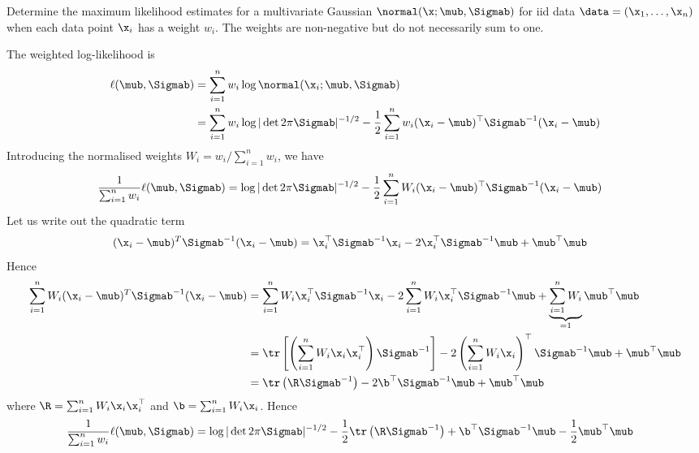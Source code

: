 \begin{exenumerate}

\item Determine the maximum likelihood estimates for a multivariate Gaussian
  $\normal(\x; \mub, \Sigmab)$ for iid data $\data = (\x_1, \ldots, \x_n)$ when
  each data point $\x_i$ has a weight $w_i$. The weights are non-negative but do
  not necessarily sum to one.

  \begin{solution}
    The weighted log-likelihood is
    \begin{align}
      \ell(\mub, \Sigmab) & = \sum_{i=1}^n w_i \log \normal(\x_i; \mub, \Sigmab)\\
                          & =  \sum_{i=1}^n w_i \log |\det 2 \pi \Sigmab|^{-1/2} - \frac{1}{2} \sum_{i=1}^n w_i (\x_i-\mub)^\top\Sigmab^{-1}(\x_i-\mub)
    \end{align}
    Introducing the normalised weights $W_i = w_i/ \sum_{i=1}^n w_i$, we have
    \begin{align}
      \frac{1}{ \sum_{i=1}^n w_i} \ell(\mub, \Sigmab)  &=  \log |\det 2 \pi \Sigmab|^{-1/2} - \frac{1}{2} \sum_{i=1}^n W_i (\x_i-\mub)^\top\Sigmab^{-1}(\x_i-\mub)
    \end{align}
    Let us write out the quadratic term
    \begin{align}
      (\x_i-\mub)^T\Sigmab^{-1}(\x_i-\mub) &= \x_i^\top\Sigmab^{-1}\x_i- 2\x_i^\top \Sigmab^{-1} \mub + \mub^\top \mub
    \end{align}
    Hence
    \begin{align}
      \sum_{i=1}^n W_i (\x_i-\mub)^T\Sigmab^{-1}(\x_i-\mub) &= \sum_{i=1}^n W_i \x_i^\top\Sigmab^{-1}\x_i -  2 \sum_{i=1}^n W_i\x_i^\top \Sigmab^{-1} \mub +
                                                             \underbrace{\sum_{i=1}^n W_i}_{=1}    \mub^\top \mub  \\
                                                            &= \tr\left[ \left( \sum_{i=1}^n W_i \x_i \x_i^\top \right) \Sigmab^{-1} \right]- 2 \left( \sum_{i=1}^n W_i\x_i  \right)^\top \Sigmab^{-1} \mub +  \mub^\top \mub \\
      &= \tr \left( \R \Sigmab^{-1}\right) -2 \b^\top \Sigmab^{-1}\mub +  \mub^\top \mub
    \end{align}
    where $\R = \sum_{i=1}^n W_i \x_i \x_i^\top $ and $\b =  \sum_{i=1}^n
    W_i\x_i$. Hence
     \begin{align}
       \frac{1}{ \sum_{i=1}^n w_i} \ell(\mub, \Sigmab)  &=  \log |\det 2 \pi \Sigmab|^{-1/2} - \frac{1}{2} \tr \left( \R \Sigmab^{-1}\right) + \b^\top \Sigmab^{-1}\mub - \frac{1}{2}  \mub^\top \mub

\end{align}
\end{solution}
\end{exenumerate}
